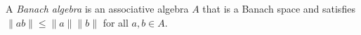 
A \emph{Banach algebra} is an associative algebra $A$ that is a Banach space and satisfies $\|ab\|\le\|a\|\|b\|$ for all $a,b\in A$.
